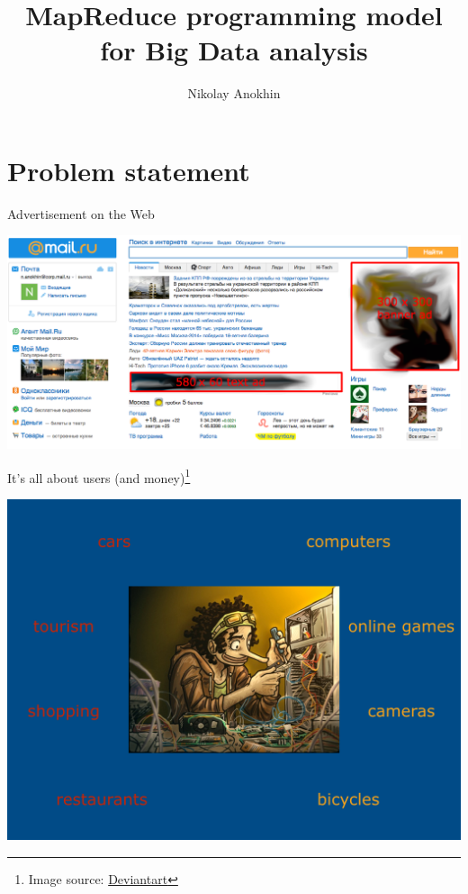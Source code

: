 \documentclass[aspectratio=1610]{beamer}
\author{Nikolay Anokhin}
\title{MapReduce programming model for Big Data analysis}
\date{}
\begin{document}
\maketitle

\section{Problem statement}

\begin{frame}{Advertisement on the Web}

\begin{center}
\includegraphics[scale=0.3]{images/banners.png}
\end{center}

\end{frame}

\begin{frame}{It's all about users (and money)\footnote{Image source: \href{http://www.deviantart.com/art/Geek-Usopp-119715834}{Deviantart}}}

\begin{center}
\includegraphics[scale=0.3]{images/geek.png}
\end{center}



\end{frame}
\end{document}
